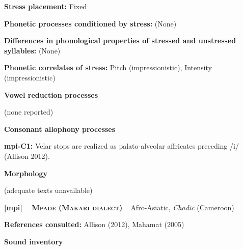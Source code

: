 \begin{styleBody}
\textbf{Stress placement:} Fixed
\end{styleBody}

\begin{styleBody}
\textbf{Phonetic processes conditioned by stress:} (None)
\end{styleBody}

\begin{styleBody}
\textbf{Differences in phonological properties of stressed and unstressed syllables:} (None)
\end{styleBody}

\begin{styleBody}
\textbf{Phonetic correlates of stress: }Pitch (impressionistic), Intensity (impressionistic)
\end{styleBody}

\begin{styleBody}
\textbf{Vowel reduction processes}
\end{styleBody}

\begin{styleBody}
(none reported)
\end{styleBody}

\begin{styleBody}
\textbf{Consonant allophony processes}
\end{styleBody}

\begin{styleBody}
\textbf{mpi-C1: }Velar stops are realized as palato-alveolar affricates preceding /i/ (Allison 2012).
\end{styleBody}

\begin{styleBody}
\textbf{Morphology}
\end{styleBody}

\begin{styleBody}
(adequate texts unavailable)
\end{styleBody}

\clearpage\begin{styleBody}
\textbf{[mpi] }\ \ \textbf{\textsc{Mpade (Makari dialect)}}\textbf{\ \ }Afro-Asiatic, \textit{Chadic} (Cameroon)
\end{styleBody}

\begin{styleBody}
\textbf{References consulted: }Allison (2012), Mahamat (2005)
\end{styleBody}

\begin{styleBody}
\textbf{Sound inventory}
\end{styleBody}

